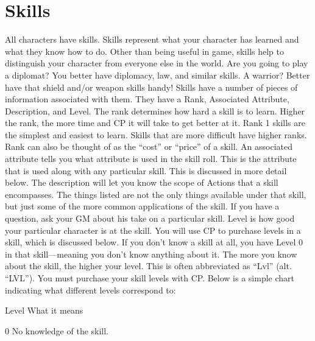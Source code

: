 \documentclass[twoside]{book}
\begin{document}
\section{Skills}
     All characters have skills. Skills represent what your
             character has learned and what they know how to do. Other
             than being useful in game, skills help to distinguish your
             character from everyone else in the world. Are you going to
             play a diplomat? You better have diplomacy, law, and similar
             skills. A warrior? Better have that shield and/or weapon
             skills handy!  Skills have a number of pieces of information
             associated with them. They have a Rank, Associated
             Attribute, Description, and Level.  The rank determines how hard a skill is to learn.
             Higher the rank, the more time and CP it will take to get
             better at it. Rank 1 skills are the simplest and easiest to
             learn. Skills that are more difficult have higher ranks.
             Rank can also be thought of as the “cost” or
             “price” of a skill.  An associated attribute tells you what attribute is
             used in the skill roll. This is the attribute that is used
             along with any particular skill. This is discussed in more
             detail below.  The description will let you know the scope of Actions
             that a skill encompasses. The things listed are not the only
             things available under that skill, but just some of the more
             common applications of the skill. If you have a question,
             ask your GM about his take on a particular skill.  Level is how good your particular character is at the
             skill. You will use CP to purchase levels in a skill, which
             is discussed below. If you don’t know a skill at all,
             you have Level 0 in that skill—meaning you don’t
             know anything about it. The more you know about the skill,
             the higher your level. This is often abbreviated as
             “Lvl” (alt. “LVL”). You must
             purchase your skill levels with CP. Below is a simple chart
             indicating what different levels correspond to:   
              
                
                 Level   
                 What it means   
                
                
                 0   
                 No knowledge of the skill.   
                
\end{document}

